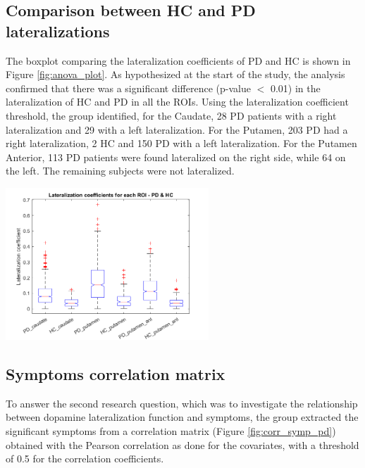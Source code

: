 \documentclass[]{article}
\newenvironment{Figure}
{\par\medskip\noindent\minipage{\linewidth}}
{\endminipage\par\medskip}
\begin{document}
\begin{multicols}{2}
\subsection{Comparison between HC and PD lateralizations}

The boxplot comparing the lateralization coefficients of PD and HC is shown in Figure \ref{fig:anova_plot}.
As hypothesized at the start of the study, the analysis confirmed that there was a significant difference (p-value $<$ 0.01) in the lateralization of HC and PD in all the ROIs.
Using the lateralization coefficient threshold, the group identified, for the Caudate, 28 PD patients with a right lateralization and 29 with a left lateralization. For the Putamen, 203 PD had a right lateralization, 2 HC and 150 PD with a left lateralization. For the Putamen Anterior, 113 PD patients were found lateralized on the right side, while 64 on the left. The remaining subjects were not lateralized.

\begin{Figure}
	\centering
	\includegraphics[width=3in]{../anova_plot_lat_hc_pd}
	\label{fig:anova_plot}
\end{Figure}

\subsection{Symptoms correlation matrix}

To answer the second research question, which was to investigate the relationship between dopamine lateralization function and symptoms, the group extracted the significant symptoms from a correlation matrix (Figure \ref{fig:corr_symp_pd}) obtained with the Pearson correlation as done for the covariates, with a threshold of 0.5 for the correlation coefficients. 



\end{multicols}
\end{document}
